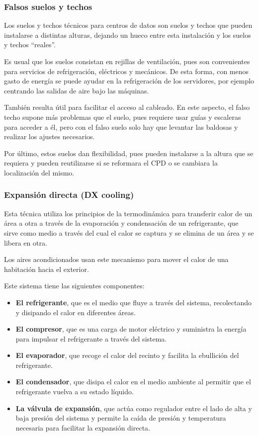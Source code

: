 \subsubsection*{Falsos suelos y techos}

Los suelos y techos técnicos para centros de datos son suelos y techos que pueden instalarse a distintas alturas, dejando un hueco entre esta instalación y los suelos y techos “reales”.

Es usual que los suelos consistan en rejillas de ventilación, pues son convenientes para servicios de refrigeración, eléctricos y mecánicos. De esta forma, con menos gasto de energía se puede ayudar en la refrigeración de los servidores, por ejemplo centrando las salidas de aire bajo las máquinas.

También resulta útil para facilitar el acceso al cableado. En este aspecto, el falso techo supone más problemas que el suelo, pues requiere usar guías y escaleras para acceder a él, pero con el falso suelo solo hay que levantar las baldosas y realizar los ajustes necesarios.

Por último, estos suelos dan flexibilidad, pues pueden instalarse a la altura que se requiera y pueden reutilizarse si se reformara el CPD o se cambiara la localización del mismo.

\subsubsection*{Expansión directa (DX cooling)}

Esta técnica utiliza los principios de la termodinámica para transferir calor de un área a otra a través de la evaporación y condensación de un refrigerante, que sirve como medio a través del cual el calor se captura y se elimina de un área y se libera en otra.

Los aires acondicionados usan este mecanismo para mover el calor de una habitación hacia el exterior.

Este sistema tiene las siguientes componentes:

\begin{itemize}
    \item {\textbf{El refrigerante}}, que es el medio que fluye a través del sistema, recolectando y disipando el calor en diferentes áreas.
    \item \textbf{El compresor}, que es una carga de motor eléctrico y suministra la energía para impulsar el refrigerante a través del sistema.
    \item \textbf{El evaporador}, que recoge el calor del recinto y facilita la ebullición del refrigerante.
    \item \textbf{El condensador}, que disipa el calor en el medio ambiente al permitir que el refrigerante vuelva a su estado líquido.
    \item \textbf{La válvula de expansión}, que actúa como regulador entre el lado de alta y baja presión del sistema y permite la caída de presión y temperatura necesaria para facilitar la expansión directa.
\end{itemize}

